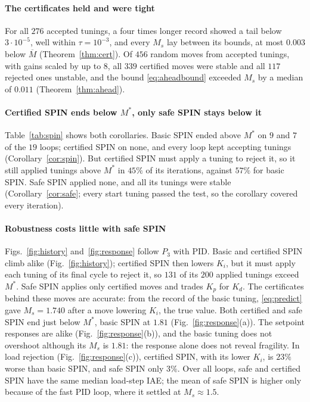 \documentclass[letterpaper, 10 pt, conference]{ieeeconf}
\newcommand{\spin}{SPIN\xspace}
\begin{document}
\paragraph*{The certificates held and were tight} For all $276$ accepted
tunings, a four times longer record showed a tail below $3\cdot10^{-5}$,
well within $\tau=10^{-3}$, and every $M_s$ lay between its bounds, at
most $0.003$ below $\overline M$ (Theorem~\ref{thm:cert}). Of $456$
random moves from accepted tunings, with gains scaled by up to $8$, all
$339$ certified moves were stable and all $117$ rejected ones unstable,
and the bound \eqref{eq:aheadbound} exceeded $M_s$ by a median of $0.011$
(Theorem~\ref{thm:ahead}).

\paragraph*{Certified \spin ends below $M^*$, only safe \spin stays below it}
Table~\ref{tab:spin} shows both corollaries. Basic \spin ended above
$M^*$ on $9$ and $7$ of the $19$ loops; certified \spin on none, and
every loop kept accepting tunings (Corollary~\ref{cor:spin}). But
certified \spin must apply a tuning to reject it, so it still applied
tunings above $M^*$ in $45\%$ of its iterations, against $57\%$ for basic
\spin. Safe \spin applied none, and all its tunings were stable
(Corollary~\ref{cor:safe}; every start tuning passed the test, so the
corollary covered every iteration).

\paragraph*{Robustness costs little with safe \spin}
Figs.~\ref{fig:history} and~\ref{fig:response} follow $P_3$ with PID.
Basic and certified \spin climb alike (Fig.~\ref{fig:history});
certified \spin then lowers $K_i$, but it must apply each tuning of its
final cycle to reject it, so $131$ of its $200$ applied tunings exceed
$M^*$. Safe \spin applies only certified moves and trades $K_p$ for
$K_d$. The certificates behind these moves are accurate: from the record
of the basic tuning, \eqref{eq:predict} gave $M_s=1.740$ after a move
lowering $K_i$, the true value. Both certified and safe \spin end just
below $M^*$, basic \spin at $1.81$ (Fig.~\ref{fig:response}(a)). The
setpoint responses are alike (Fig.~\ref{fig:response}(b)), and the
basic tuning does not overshoot although its $M_s$ is $1.81$: the
response alone does not reveal fragility. In load rejection
(Fig.~\ref{fig:response}(c)), certified \spin, with its lower $K_i$, is
$23\%$ worse than basic \spin, and safe \spin only $3\%$. Over all
loops, safe and certified \spin have the same median load-step IAE; the
mean of safe \spin is higher only because of the fast PID loop, where it
settled at $M_s\approx1.5$.
\end{document}
